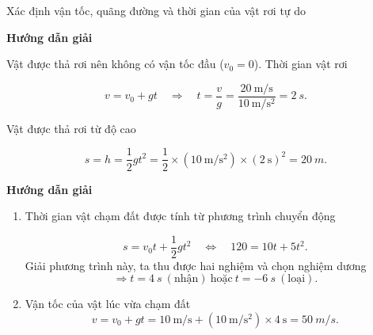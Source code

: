 \begin{dang}{Xác định vận tốc, quãng đường và thời gian của vật rơi tự do}
	
	{	\begin{center}
			\textbf{Hướng dẫn giải}
		\end{center}
		
		Vật được thả rơi nên không có vận tốc đầu ($v_0=0$). Thời gian vật rơi
		
		$$ v = v_0 +gt \quad\Rightarrow\quad t = \dfrac{v}{g} =\dfrac{\SI{20}{\meter/\second}}{\SI{10}{\meter/\second^2}}= \SI{2}{s}.$$
		
		Vật được thả rơi từ độ cao
		
		$$ s =h = \dfrac{1}{2}gt^2 =\dfrac{1}{2}\times(\SI{10}{\meter/\second^2})\times(\SI{2}{\second})^{2}=\SI{20}{m}.$$
	}
	{	\begin{center}
			\textbf{Hướng dẫn giải}
		\end{center}
		\begin{enumerate}[label=\alph*.]
			\item Thời gian vật chạm đất được tính từ phương trình chuyển động
			
			$$s = v_0t + \dfrac{1}{2}gt^2 \quad\Leftrightarrow\quad 120 = 10t + 5t^2.$$
			Giải phương trình này, ta thu được hai nghiệm và chọn nghiệm dương
			$$\Rightarrow t = \SI{4}{s}\ (\text{nhận})\ \text{hoặc} \ t = -\SI{6}{s}\ (\text{loại}).$$
			
			\item Vận tốc của vật lúc vừa chạm đất
			$$v = v_0 + gt =\SI{10}{\meter/\second}+(\SI{10}{\meter/\second^{2}})\times\SI{4}{\second}= \SI{50}{m/s}.$$
		\end{enumerate}	
	}
\end{dang}

